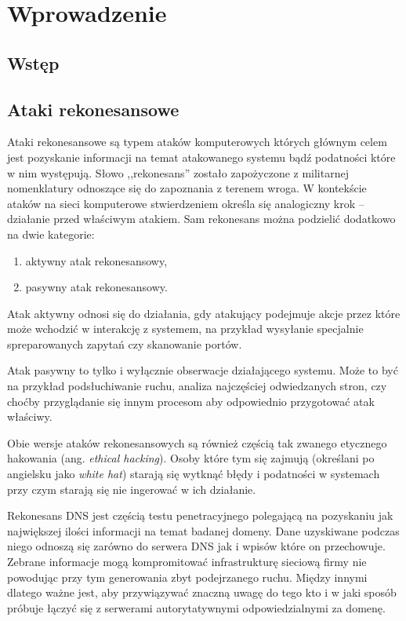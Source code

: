 \chapter{Wprowadzenie}

\section{Wstęp}


\section{Ataki rekonesansowe}
Ataki rekonesansowe są typem ataków komputerowych których głównym celem jest pozyskanie informacji na temat atakowanego systemu bądź
podatności które w nim występują. Słowo ,,rekonesans'' zostało zapożyczone z militarnej nomenklatury odnoszące się do zapoznania z
terenem wroga. W kontekście ataków na sieci komputerowe stwierdzeniem określa się analogiczny krok -- działanie przed właściwym atakiem.
Sam rekonesans można podzielić dodatkowo na dwie kategorie:
\begin{enumerate}
	\item aktywny atak rekonesansowy,
	\item pasywny atak rekonesansowy.
\end{enumerate}
Atak aktywny odnosi się do działania, gdy atakujący podejmuje akcje przez które może wchodzić w interakcję z systemem, na przykład
wysyłanie specjalnie spreparowanych zapytań czy skanowanie portów.

Atak pasywny to tylko i wyłącznie obserwacje działającego systemu. Może to być na przykład podsłuchiwanie ruchu, analiza najczęściej
odwiedzanych stron, czy choćby przyglądanie się innym procesom aby odpowiednio przygotować atak właściwy.

Obie wersje ataków rekonesansowych są również częścią tak zwanego etycznego hakowania (ang. \textit{ethical hacking}). Osoby które
tym się zajmują (określani po angielsku jako \textit{white hat}) starają się wytknąć błędy i podatności w systemach przy czym starają
się nie ingerować w ich działanie.

Rekonesans DNS jest częścią testu penetracyjnego polegającą na pozyskaniu jak największej ilości informacji na temat badanej domeny.
Dane uzyskiwane podczas niego odnoszą się zarówno do serwera DNS jak i wpisów które on przechowuje. Zebrane informacje mogą
kompromitować infrastrukturę sieciową firmy nie powodując przy tym generowania zbyt podejrzanego ruchu. Między innymi dlatego
ważne jest, aby przywiązywać znaczną uwagę do tego kto i w jaki sposób próbuje łączyć się z serwerami autorytatywnymi odpowiedzialnymi
za domenę.


